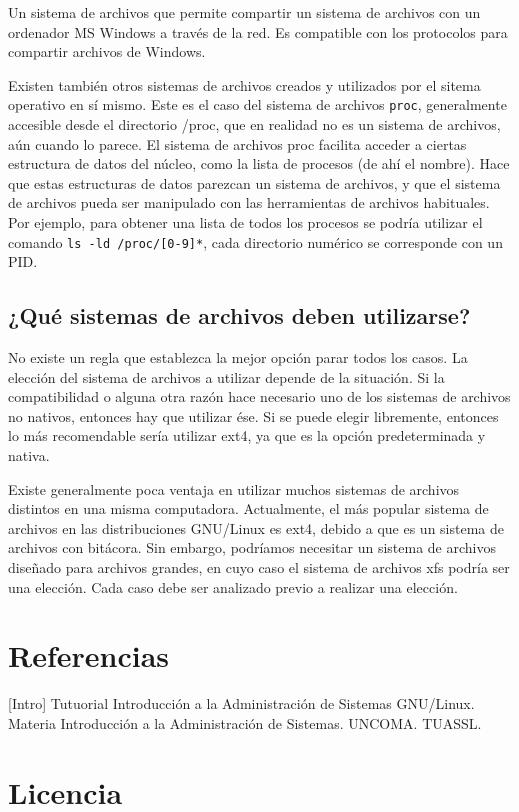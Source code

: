 \documentclass[12pt]{article}
\begin{document}
    Un sistema de archivos que permite compartir un sistema de archivos con
un ordenador MS Windows a través de la red. Es compatible con los 
protocolos para compartir archivos de Windows. 


Existen también otros sistemas de archivos creados y utilizados por el 
sitema operativo en sí mismo. Este es el caso del sistema de archivos 
\texttt{proc}, generalmente accesible desde el directorio /proc, que en 
realidad no es un sistema de archivos, aún cuando lo parece. El sistema 
de archivos proc 
facilita acceder a ciertas estructura de datos del núcleo, como la lista 
de procesos (de ahí el nombre). Hace que estas estructuras de datos 
parezcan un sistema de archivos, y que el sistema de archivos pueda ser 
manipulado con las herramientas de archivos habituales. Por ejemplo, para
obtener una lista de todos los procesos se podría utilizar el comando 
\texttt{ls -ld /proc/[0-9]*}, cada directorio numérico se corresponde con
un PID. 


\subsection*{¿Qué sistemas de archivos deben utilizarse?}

No existe un regla que establezca la mejor opción parar todos los casos. 
La elección del sistema de archivos a utilizar depende de la situación. Si 
la compatibilidad o alguna otra razón hace necesario uno de los sistemas 
de archivos no nativos, entonces hay que utilizar ése. Si se puede elegir 
libremente, entonces lo más recomendable sería utilizar ext4, ya que es 
la opción predeterminada y nativa. 

Existe generalmente poca ventaja en utilizar muchos sistemas de archivos 
distintos en una misma computadora. Actualmente, el más popular 
sistema de archivos en las distribuciones GNU/Linux es ext4, debido a que 
es un sistema de archivos con bitácora. Sin embargo, podríamos necesitar 
un sistema de archivos diseñado para archivos grandes, en cuyo caso 
el sistema de archivos xfs podría ser una elección. Cada caso debe ser
analizado previo a realizar una elección.


\section*{Referencias}

[Intro] Tutuorial Introducción a la Administración de Sistemas GNU/Linux. Materia Introducción
a la Administración de Sistemas. UNCOMA. TUASSL. 

\section*{Licencia}
\end{document}
